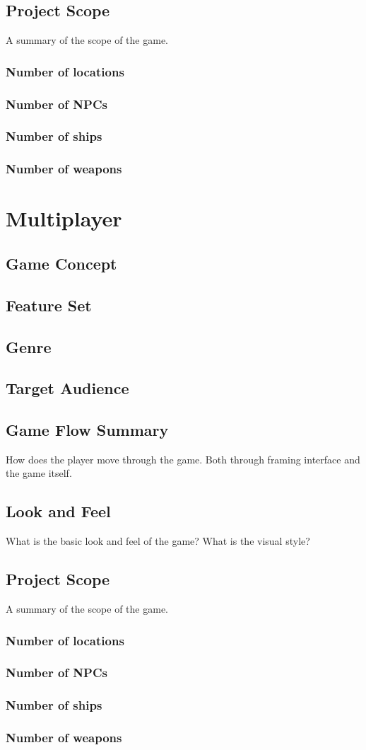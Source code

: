 \subsection{Project Scope}
A summary of the scope of the game.
\subsubsection{Number of locations}
\subsubsection{Number of NPCs}
\subsubsection{Number of ships}
\subsubsection{Number of weapons}

\section{Multiplayer}
\subsection{Game Concept}
\subsection{Feature Set}
\subsection{Genre}
\subsection{Target Audience}
\subsection{Game Flow Summary}
How does the player move through the game.   Both through framing interface and the game itself.
\subsection{Look and Feel}  
What is the basic look and feel of the game?  What is the visual style?
\subsection{Project Scope}
A summary of the scope of the game.
\subsubsection{Number of locations}
\subsubsection{Number of NPCs}
\subsubsection{Number of ships}
\subsubsection{Number of weapons}
